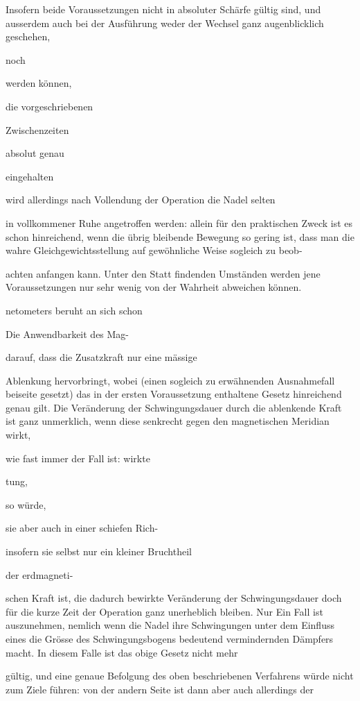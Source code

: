 \documentclass[12pt,a4paper]{article}
\begin{document}
Insofern beide Voraussetzungen nicht in absoluter Schärfe gültig sind, und ausserdem auch bei der Ausführung weder der Wechsel ganz augenblicklich geschehen,

noch

werden können,

die vorgeschriebenen

Zwischenzeiten

absolut genau

eingehalten

wird allerdings nach Vollendung der Operation die Nadel selten

in vollkommener Ruhe angetroffen werden: allein für den praktischen Zweck ist es schon hinreichend, wenn die übrig bleibende Bewegung so gering ist, dass man die wahre Gleichgewichtsstellung auf gewöhnliche Weise sogleich zu beob-

achten anfangen kann. Unter den Statt findenden Umständen werden jene Voraussetzungen nur sehr wenig von der Wahrheit abweichen können.

netometers beruht an sich schon

Die Anwendbarkeit des Mag-

darauf, dass die Zusatzkraft nur eine mässige

Ablenkung hervorbringt, wobei (einen sogleich zu erwähnenden Ausnahmefall beiseite gesetzt) das in der ersten Voraussetzung enthaltene Gesetz hinreichend genau gilt. Die Veränderung der Schwingungsdauer durch die ablenkende Kraft ist ganz unmerklich, wenn diese senkrecht gegen den magnetischen Meridian wirkt,

wie fast immer der Fall ist: wirkte

tung,

so würde,

sie aber auch in einer schiefen Rich-

insofern sie selbst nur ein kleiner Bruchtheil

der erdmagneti-

schen Kraft ist, die dadurch bewirkte Veränderung der Schwingungsdauer doch für die kurze Zeit der Operation ganz unerheblich bleiben. Nur Ein Fall ist auszunehmen, nemlich wenn die Nadel ihre Schwingungen unter dem Einfluss eines die Grösse des Schwingungsbogens bedeutend vermindernden Dämpfers macht. In diesem Falle ist das obige Gesetz nicht mehr

gültig, und eine genaue Befolgung des oben beschriebenen Verfahrens würde nicht zum Ziele führen: von der andern Seite ist dann aber auch allerdings der
\end{document}
